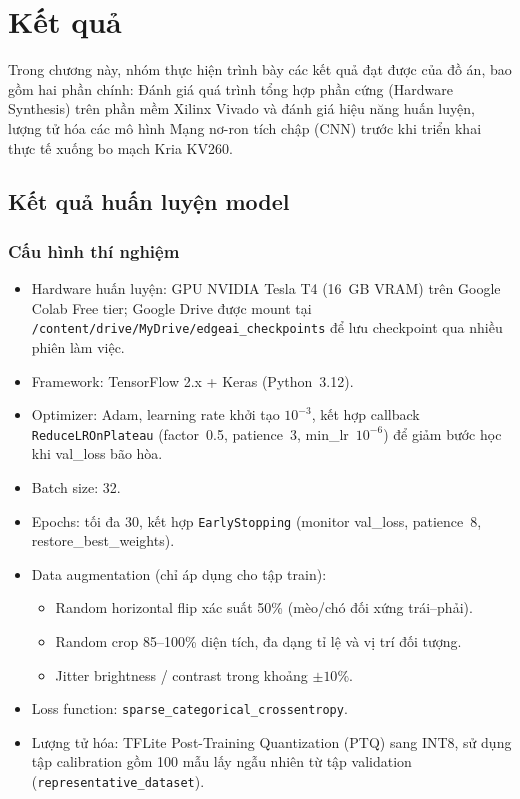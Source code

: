 \chapter{Kết quả}
\label{chp:06}

Trong chương này, nhóm thực hiện trình bày các kết quả đạt được của đồ án, bao gồm hai phần chính: Đánh giá quá trình tổng hợp phần cứng (Hardware Synthesis) trên phần mềm Xilinx Vivado và đánh giá hiệu năng huấn luyện, lượng tử hóa các mô hình Mạng nơ-ron tích chập (CNN) trước khi triển khai thực tế xuống bo mạch Kria KV260.

\section{Kết quả huấn luyện model}
\label{sec:training-results}

\subsection{Cấu hình thí nghiệm}
\begin{itemize}
    \item Hardware huấn luyện: GPU NVIDIA Tesla T4 (16~GB VRAM) trên Google Colab Free tier; Google Drive được mount tại \texttt{/content/drive/MyDrive/edgeai\_checkpoints} để lưu checkpoint qua nhiều phiên làm việc.
    \item Framework: TensorFlow 2.x + Keras (Python~3.12).
    \item Optimizer: Adam, learning rate khởi tạo $10^{-3}$, kết hợp callback \texttt{ReduceLROnPlateau} (factor~0.5, patience~3, min\_lr~$10^{-6}$) để giảm bước học khi val\_loss bão hòa.
    \item Batch size: 32.
    \item Epochs: tối đa 30, kết hợp \texttt{EarlyStopping} (monitor val\_loss, patience~8, restore\_best\_weights).
    \item Data augmentation (chỉ áp dụng cho tập train):
        \begin{itemize}
            \item Random horizontal flip xác suất 50\% (mèo/chó đối xứng trái–phải).
            \item Random crop 85--100\% diện tích, đa dạng tỉ lệ và vị trí đối tượng.
            \item Jitter brightness / contrast trong khoảng $\pm 10\%$.
        \end{itemize}
    \item Loss function: \texttt{sparse\_categorical\_crossentropy}.
    \item Lượng tử hóa: TFLite Post-Training Quantization (PTQ) sang INT8, sử dụng tập calibration gồm 100 mẫu lấy ngẫu nhiên từ tập validation (\texttt{representative\_dataset}).
\end{itemize}


